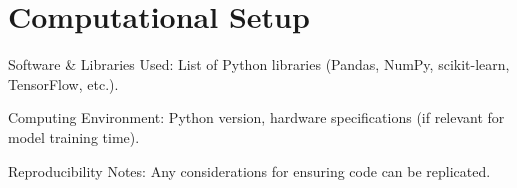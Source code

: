 \chapter{Computational Setup}

Software & Libraries Used: List of Python libraries (Pandas, NumPy, scikit-learn, TensorFlow, etc.).

Computing Environment: Python version, hardware specifications (if relevant for model training time).

Reproducibility Notes: Any considerations for ensuring code can be replicated.
